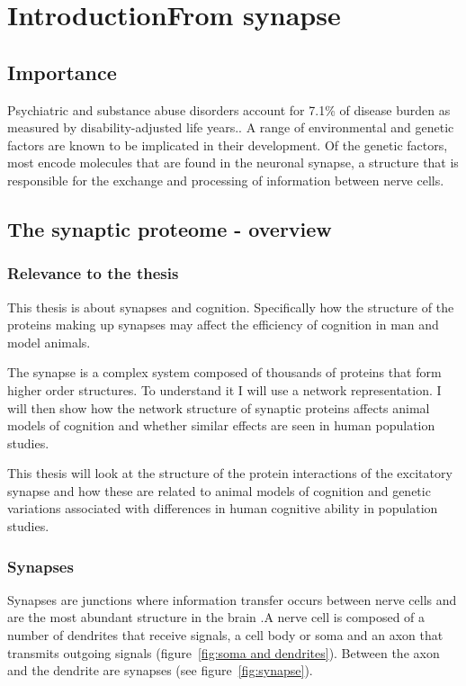 \chapter{IntroductionFrom  synapse}

\section{Importance}

Psychiatric and substance abuse disorders account for 7.1\% of disease burden as measured by disability-adjusted life years.\cite{murray2015global}.   A range of environmental and genetic factors are known to be implicated in their development. Of the genetic factors, most encode molecules that are found in the neuronal synapse, a structure that is responsible for the exchange and processing of information between nerve cells.

\section{The synaptic proteome - overview}

\subsection{Relevance to the thesis}
This thesis is about synapses and cognition. Specifically how the structure of the proteins making up synapses may affect the efficiency of cognition in man and model animals. 

The synapse is a complex system composed of thousands of proteins that form higher order structures.\cite{grant2012synaptopathies} To understand it I will use a network representation. I will then show how the network structure of synaptic proteins affects animal models of cognition and whether similar effects are seen in human population studies. 

This thesis will look at the structure of the protein interactions of the excitatory synapse and how these are related to animal models of cognition and genetic variations associated with differences in human cognitive ability in population studies.

\subsection{Synapses}
Synapses are junctions where information transfer occurs between nerve cells and are the most abundant structure in the brain \cite{grant2012synaptopathies}.A nerve cell is composed of a number of dendrites that receive signals, a cell body or soma and an axon that transmits outgoing signals (figure~\ref{fig:soma and dendrites}). Between the axon and the dendrite are synapses (see figure~\ref{fig:synapse}).

